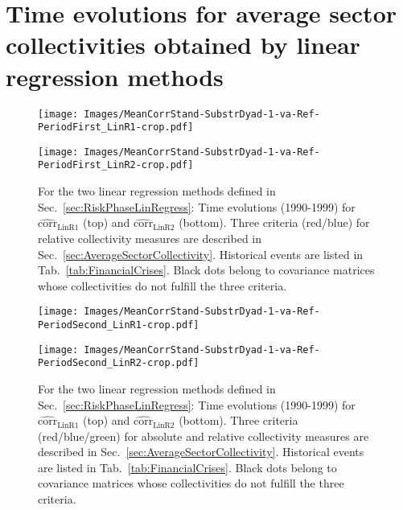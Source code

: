 \documentclass[aps, pra, groupedaddress, showkeys, twocolumn, floatfix, 10pt]{revtex4-2}
\newcommand*\meanNONDiag[1]{\widehat{#1}}
\begin{document}
\clearpage


\section{\label{sec:TimeEvoLinRegress}Time evolutions for average sector collectivities obtained by linear regression methods}

%
\begin{figure*}[!htb]
	\centering
	\begin{minipage}{1.0\textwidth}
		\subfloat%
		{\texttt{[image: Images/MeanCorrStand-SubstrDyad-1-va-Ref-PeriodFirst\_LinR1-crop.pdf]}
		}\par
		\subfloat%
		{\texttt{[image: Images/MeanCorrStand-SubstrDyad-1-va-Ref-PeriodFirst\_LinR2-crop.pdf]}
		}%
	\end{minipage}%
	\caption{\label{subfig:Main:MeanValCovP1_LinR}For the two linear regression methods defined in Sec.~\ref{sec:RiskPhaseLinRegress}: Time evolutions (1990-1999) for $\meanNONDiag{\text{corr}}_{\text{LinR1}}$ (top) and $\meanNONDiag{\text{corr}}_{\text{LinR2}}$ (bottom).
		Three criteria (red/blue) for relative collectivity measures are described in Sec.~\ref{sec:AverageSectorCollectivity}. Historical events are listed in Tab.~\ref{tab:FinancialCrises}. Black dots belong to covariance matrices whose collectivities do not fulfill the three criteria.}
\end{figure*}
%


%
\begin{figure*}[!htb]
	\centering
	\begin{minipage}{1.0\textwidth}
		\subfloat%
		{\texttt{[image: Images/MeanCorrStand-SubstrDyad-1-va-Ref-PeriodSecond\_LinR1-crop.pdf]}
		}\par
		\subfloat%
		{\texttt{[image: Images/MeanCorrStand-SubstrDyad-1-va-Ref-PeriodSecond\_LinR2-crop.pdf]}
		}%
	\end{minipage}%
	\caption{\label{subfig:Main:MeanValCovP2_LinR}For the two linear regression methods defined in Sec.~\ref{sec:RiskPhaseLinRegress}: Time evolutions (1990-1999) for $\meanNONDiag{\text{corr}}_{\text{LinR1}}$ (top) and $\meanNONDiag{\text{corr}}_{\text{LinR2}}$ (bottom).
		Three criteria (red/blue/green) for absolute and relative collectivity measures are described in Sec.~\ref{sec:AverageSectorCollectivity}. Historical events are listed in Tab.~\ref{tab:FinancialCrises}. Black dots belong to covariance matrices whose collectivities do not fulfill the three criteria.}
\end{figure*}
%
\end{document}
